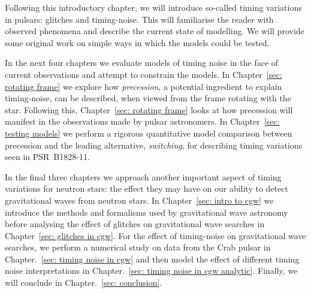 \documentclass[../full_thesis/full_thesis.tex]{subfiles}
\begin{document}
Following this introductory chapter, we will introduce so-called timing
variations in pulsars: glitches and timing-noise. This will familiarise the
reader with observed phenomena and describe the current state of modelling.  We
will provide some original work on simple ways in which the models could be
tested.

In the next four chapters we evaluate models of timing noise in the face of
current observations and attempt to constrain the models.  In Chapter~\ref{sec:
rotating frame} we explore how \emph{precession}, a potential ingredient to
explain timing-noise, can be described, when viewed from the frame rotating
with the star. Following this, Chapter~\ref{sec: rotating frame} looks at how
precession will manifest in the observations made by pulsar astronomers. In
Chapter~\ref{sec: testing models} we perform a rigorous quantitative model
comparison between precession and the leading alternative, \emph{switching},
for describing timing variations seen in PSR~B1828-11.

In the final three chapters we approach another important aspect of timing
variations for neutron stars: the effect they may have on our ability to detect
gravitational waves from neutron stars. In Chapter~\ref{sec: intro to cgw} we
introduce the methods and formalisms used by gravitational wave astronomy
before analysing the effect of glitches on gravitational wave searches in
Chapter~\ref{sec: glitches in cgw}. For the effect of timing-noise on
gravitational wave searches, we perform a numerical study on data from the Crab
pulsar in Chapter.~\ref{sec: timing noise in cgw} and then model the effect of
different timing noise interpretations in Chapter.~\ref{sec: timing noise in
cgw analytic}. Finally, we will conclude in Chapter.~\ref{sec: conclusion}.

\biblio
\end{document}
